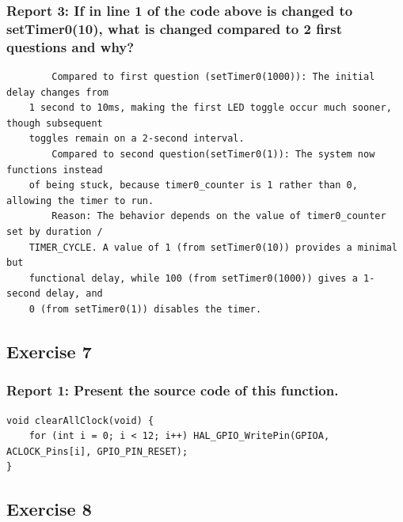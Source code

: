 \documentclass[a4paper,12pt]{article}
\begin{document}
\subsubsection{Report 3: If in line 1 of the code above is changed to setTimer0(10), what is changed compared to 2 first questions and why?}
\begin{verbatim}
	    Compared to first question (setTimer0(1000)): The initial delay changes from 
 	1 second to 10ms, making the first LED toggle occur much sooner, though subsequent 
	toggles remain on a 2-second interval.
	    Compared to second question(setTimer0(1)): The system now functions instead 
	of being stuck, because timer0_counter is 1 rather than 0, allowing the timer to run.
	    Reason: The behavior depends on the value of timer0_counter set by duration / 
	TIMER_CYCLE. A value of 1 (from setTimer0(10)) provides a minimal but 
	functional delay, while 100 (from setTimer0(1000)) gives a 1-second delay, and 
	0 (from setTimer0(1)) disables the timer.
\end{verbatim}
\newpage
\subsection{Exercise 7}
\subsubsection{Report 1: Present the source code of this function.}
\begin{lstlisting}
void clearAllClock(void) {
	for (int i = 0; i < 12; i++) HAL_GPIO_WritePin(GPIOA, ACLOCK_Pins[i], GPIO_PIN_RESET);
}
\end{lstlisting}
\subsection{Exercise 8}
\end{document}
